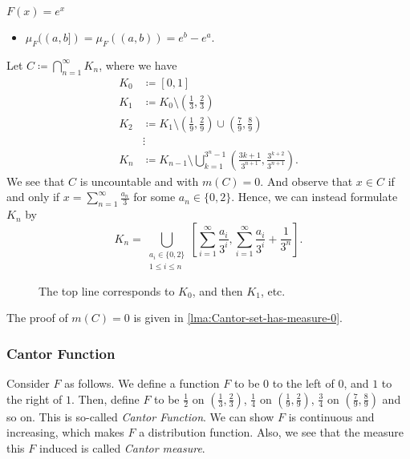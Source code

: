 \begin{eg}
	\(F(x) = e^x\)
	\begin{itemize}
		\item \(\mu _F((a, b]) = \mu _F((a, b)) = e^b - e^a\).
	\end{itemize}
\end{eg}

\begin{eg}\label{eg:lec8:Cantor-set}
	Let \(C \coloneqq \bigcap_{n=1}^{\infty} K_{n}\), where we have
	\[
		\begin{split}
			K_0 & \coloneqq [0, 1]                                                                                              \\
			K_1 & \coloneqq K_{0}\setminus \left(\frac{1}{3}, \frac{2}{3}\right)                                                \\
			K_2 & \coloneqq K_{1}\setminus \left(\frac{1}{9}, \frac{2}{9}\right) \cup \left(\frac{7}{9}, \frac{8}{9}\right)     \\
			    & \vdots                                                                                                        \\
			K_n & \coloneqq K_{n-1}\setminus \bigcup_{k=1}^{3^n - 1}\left(\frac{3k+1}{3^{n+1}}, \frac{3^{k+2}}{3^{n+1}}\right).
		\end{split}
	\]
	We see that \(C\) is uncountable and with \(m(C) = 0\). And observe that \(x\in C\) if and only if \(x = \sum_{n=1}^{\infty} \frac{a_n}{3}\) for some \(a_n\in\{0, 2\}\). Hence, we can instead formulate \(K_{n}\) by
	\[
		K_{n} = \bigcup_{\substack{a_{i}\in\{0, 2\}\\ 1\leq i\leq n}}\left[\sum_{i=1}^{\infty} \frac{a_{i}}{3^i}, \sum_{i=1}^{\infty} \frac{a_{i}}{3^i} + \frac{1}{3^n}\right].
	\]

	\begin{figure}[H]
		\centering
		\caption{The top line corresponds to \(K_0\), and then \(K_1\), etc.}
	\end{figure}
	The proof of \(m(C) = 0\) is given in \autoref{lma:Cantor-set-has-measure-0}.
\end{eg}

\subsubsection{Cantor Function}\label{sssec:Cantor-Function}
Consider \(F\) as follows. We define a function \(F\) to be \(0\) to the left of \(0\),  and \(1\) to the right of \(1\). Then, define \(F\) to be \(\frac{1}{2}\) on \(\left(\frac{1}{3}, \frac{2}{3}\right)\), \(\frac{1}{4}\) on \(\left(\frac{1}{9}, \frac{2}{9}\right)\), \(\frac{3}{4}\) on \(\left(\frac{7}{9}, \frac{8}{9}\right)\) and so on. This is so-called \emph{Cantor Function}. We can show \(F\) is continuous and increasing, which makes \(F\) a distribution function. Also, we see that the measure this \(F\) induced is called \emph{Cantor measure}\label{def:Cantor-measure}.


